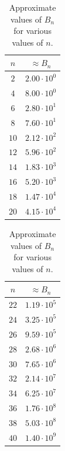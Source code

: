 \documentclass[runningheads,orivec]{llncs}
\begin{document}
    \begin{table}
    	\scriptsize
    	\centering
        \caption{Approximate values of $B_n$ for various values of $n$.}
    	\label{table:walsh_bounds}
    	\begin{minipage}{0.24\textwidth}
            \centering
            \begin{tabular}{|c|c|}
                \hline
                $n$&$\approx B_n$\\
                \hline
                $2$&$2.00\cdot 10^{0}$\\
                $4$&$8.00\cdot 10^{0}$\\
                $6$&$2.80\cdot 10^{1}$\\
                $8$&$7.60\cdot 10^{1}$\\
                $10$&$2.12\cdot 10^{2}$\\
                $12$&$5.96\cdot 10^{2}$\\
                $14$&$1.83\cdot 10^{3}$\\
                $16$&$5.20\cdot 10^{3}$\\
                $18$&$1.47\cdot 10^{4}$\\
                $20$&$4.15\cdot 10^{4}$\\
                \hline
            \end{tabular}
        \end{minipage}%
        \begin{minipage}{0.24\textwidth}
            \centering
            \begin{tabular}{|c|c|}
                \hline
                $n$&$\approx B_n$\\
                \hline
                $22$&$1.19\cdot 10^{5}$\\
                $24$&$3.25\cdot 10^{5}$\\
                $26$&$9.59\cdot 10^{5}$\\
                $28$&$2.68\cdot 10^{6}$\\
                $30$&$7.65\cdot 10^{6}$\\
                $32$&$2.14\cdot 10^{7}$\\
                $34$&$6.25\cdot 10^{7}$\\
                $36$&$1.76\cdot 10^{8}$\\
                $38$&$5.03\cdot 10^{8}$\\
                $40$&$1.40\cdot 10^{9}$\\
                \hline

\end{tabular}
\end{minipage}
\end{table}
\end{document}
